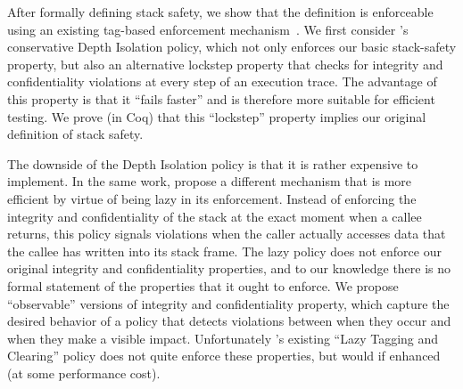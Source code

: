 \documentclass[acmsmall,review,anonymous]{acmart}\settopmatter{printfolios=true,printccs=false,printacmref=false}
\begin{document}
After formally defining stack safety, we show that the definition is
enforceable using an existing tag-based enforcement
mechanism~\citep{DBLP:conf/sp/RoesslerD18}. We first consider
\citeauthor{DBLP:conf/sp/RoesslerD18}'s
conservative Depth Isolation policy, which not only enforces our basic
stack-safety property, but also an alternative lockstep property that
checks for integrity and confidentiality violations at every step of
an execution trace. The advantage of this property is that it ``fails
faster'' and is therefore more suitable for efficient testing. We prove (in
Coq) that this ``lockstep'' property implies our original definition of stack
safety.

The downside of the Depth Isolation policy is that it is rather
expensive to implement. In the same work,
\citeauthor{DBLP:conf/sp/RoesslerD18} propose a different mechanism
that is more efficient by virtue of being lazy in its enforcement.
Instead of enforcing the integrity and confidentiality of the stack at the
exact moment
when a callee returns, this policy signals violations when the
caller actually accesses data that the callee has written into its stack
frame\ifaftersubmission{}\fi.
The lazy policy does not enforce our original integrity and confidentiality
properties, and to our knowledge there is no formal statement of the properties that
it ought to enforce. We propose ``observable'' versions of integrity and
confidentiality property, which capture the desired behavior of a policy that
detects violations between when they occur and when they make a visible impact.
Unfortunately \citeauthor{DBLP:conf/sp/RoesslerD18}'s existing ``Lazy Tagging
and Clearing'' policy does not quite enforce these properties,
but would if enhanced (at some performance cost).

\end{document}
